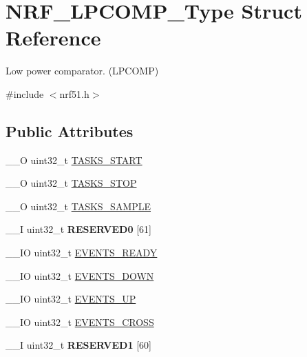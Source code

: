 \hypertarget{struct_n_r_f___l_p_c_o_m_p___type}{}\section{N\+R\+F\+\_\+\+L\+P\+C\+O\+M\+P\+\_\+\+Type Struct Reference}
\label{struct_n_r_f___l_p_c_o_m_p___type}


Low power comparator. (L\+P\+C\+O\+M\+P)  




{\ttfamily \#include $<$nrf51.\+h$>$}

\subsection*{Public Attributes}
\begin{DoxyCompactItemize}
\item 
\+\_\+\+\_\+\+O uint32\+\_\+t \hyperlink{struct_n_r_f___l_p_c_o_m_p___type_a1acb51d6c4b471da92485d457599bd3e}{T\+A\+S\+K\+S\+\_\+\+S\+T\+A\+R\+T}
\item 
\+\_\+\+\_\+\+O uint32\+\_\+t \hyperlink{struct_n_r_f___l_p_c_o_m_p___type_a777e434d87df28fc3b1b5483dafade02}{T\+A\+S\+K\+S\+\_\+\+S\+T\+O\+P}
\item 
\+\_\+\+\_\+\+O uint32\+\_\+t \hyperlink{struct_n_r_f___l_p_c_o_m_p___type_af36f299c6366f7cb99245291edc776a3}{T\+A\+S\+K\+S\+\_\+\+S\+A\+M\+P\+L\+E}
\item 
\hypertarget{struct_n_r_f___l_p_c_o_m_p___type_a4d2e684caa6562a2512cbb30cff9deb6}{}\+\_\+\+\_\+\+I uint32\+\_\+t {\bfseries R\+E\+S\+E\+R\+V\+E\+D0} \mbox{[}61\mbox{]}\label{struct_n_r_f___l_p_c_o_m_p___type_a4d2e684caa6562a2512cbb30cff9deb6}

\item 
\+\_\+\+\_\+\+I\+O uint32\+\_\+t \hyperlink{struct_n_r_f___l_p_c_o_m_p___type_abf4859a324423aea0dacc5f5bc5e0ca2}{E\+V\+E\+N\+T\+S\+\_\+\+R\+E\+A\+D\+Y}
\item 
\+\_\+\+\_\+\+I\+O uint32\+\_\+t \hyperlink{struct_n_r_f___l_p_c_o_m_p___type_a25487dca9f2b5573a9ac7bc47a9b84eb}{E\+V\+E\+N\+T\+S\+\_\+\+D\+O\+W\+N}
\item 
\+\_\+\+\_\+\+I\+O uint32\+\_\+t \hyperlink{struct_n_r_f___l_p_c_o_m_p___type_ad9d95f0176b3f07b4c543e1cce7e071a}{E\+V\+E\+N\+T\+S\+\_\+\+U\+P}
\item 
\+\_\+\+\_\+\+I\+O uint32\+\_\+t \hyperlink{struct_n_r_f___l_p_c_o_m_p___type_ac558ee46dfd50e2c09c3d343be838a86}{E\+V\+E\+N\+T\+S\+\_\+\+C\+R\+O\+S\+S}
\item 
\hypertarget{struct_n_r_f___l_p_c_o_m_p___type_a03c20536681f98f30123079c874a6137}{}\+\_\+\+\_\+\+I uint32\+\_\+t {\bfseries R\+E\+S\+E\+R\+V\+E\+D1} \mbox{[}60\mbox{]}\label{struct_n_r_f___l_p_c_o_m_p___type_a03c20536681f98f30123079c874a6137}


\end{DoxyCompactItemize}
